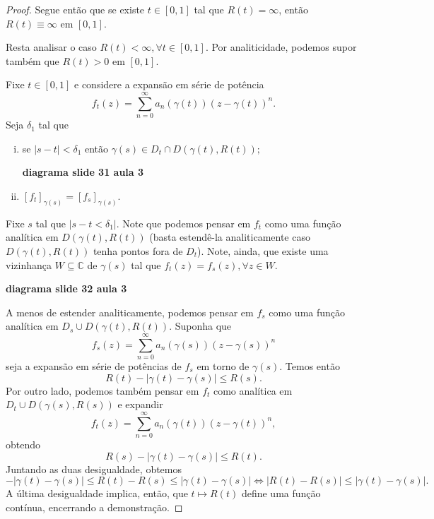 \begin{proof}
Segue então que se existe $t\in [0,1]$ tal que $R(t) = \infty$, então
$R(t) \equiv\infty$ em $[0,1]$.

Resta analisar o caso $R(t) < \infty, \forall t\in[0,1]$. Por analiticidade, podemos
supor também que $R(t) > 0$ em $[0,1]$.

Fixe $t\in [0,1]$ e considere a expansão em série de potência
\begin{equation*}
    f_t(z) = \sum_{n=0}^{\infty} a_n(\gamma(t))(z-\gamma(t))^n.
\end{equation*}
Seja $\delta_1$ tal que 
\begin{enumerate}[i)]
    \item se $|s-t|<\delta_1$ então $\gamma(s)\in D_t\cap D(\gamma(t), R(t));$
    
    \begin{center}
        \textbf{diagrama slide 31 aula 3}
    \end{center}
    
    \item $[f_t]_{\gamma(s)} = [f_s]_{\gamma(s)}$.
\end{enumerate}
Fixe $s$ tal que $|s-t<\delta_1|$. Note que podemos pensar em $f_t$ como uma 
função analítica em $D(\gamma(t), R(t))$ (basta estendê-la analiticamente caso
$D(\gamma(t), R(t))$ tenha pontos fora de $D_t$). Note, ainda, que existe uma 
vizinhança $W\subseteq\mathbb{C}$ de $\gamma(s)$ tal que 
$f_t(z) = f_s(z), \forall z\in W$.

\begin{center}
    \textbf{diagrama slide 32 aula 3}
\end{center}

A menos de estender analiticamente, podemos pensar em $f_s$ como uma função analítica
em $D_s\cup D(\gamma(t), R(t))$. Suponha que
\begin{equation*}
    f_s(z) = \sum_{n=0}^\infty a_n(\gamma(s))(z-\gamma(s))^n
\end{equation*}
seja a expansão em série de potências de $f_s$ em torno de $\gamma(s)$. Temos então
\begin{equation*}
    R(t) - |\gamma(t) - \gamma(s)| \leq R(s).
\end{equation*}
Por outro lado, podemos também pensar em $f_t$ como analítica em 
$D_t\cup D(\gamma(s), R(s))$ e expandir
\begin{equation*}
    f_t(z) = \sum_{n=0}^\infty a_n(\gamma(t))(z-\gamma(t))^n,
\end{equation*}
obtendo
\begin{equation*}
    R(s) - |\gamma(t) - \gamma(s)| \leq R(t).
\end{equation*}
Juntando as duas desigualdade, obtemos
\begin{equation*}
    -|\gamma(t) - \gamma(s)| \leq R(t) - R(s) \leq |\gamma(t) - \gamma(s)| 
    \iff
    |R(t) - R(s)| \leq |\gamma(t) - \gamma(s)|.
\end{equation*}
A última desigualdade implica, então, que $t\mapsto R(t)$ define uma função contínua,
encerrando a demonstração.
\end{proof}

